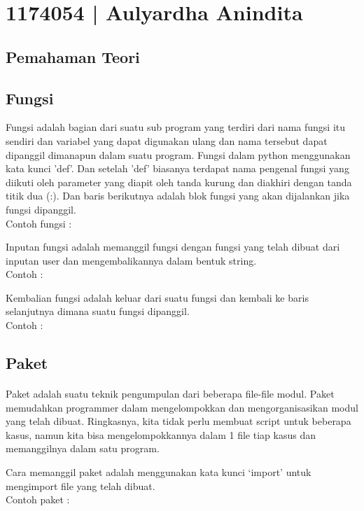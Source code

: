 \section{1174054 | Aulyardha Anindita}
\subsection{Pemahaman Teori}
\subsection{Fungsi}
Fungsi adalah bagian dari suatu sub program yang terdiri dari nama fungsi itu sendiri dan variabel yang dapat digunakan ulang dan nama tersebut dapat dipanggil dimanapun dalam suatu program. Fungsi dalam python menggunakan kata kunci 'def'. Dan setelah 'def' biasanya terdapat nama pengenal fungsi yang diikuti oleh parameter yang diapit oleh tanda kurung dan diakhiri dengan tanda titik dua (:). Dan baris berikutnya adalah blok fungsi yang akan dijalankan jika fungsi dipanggil.\\
Contoh fungsi :


Inputan fungsi adalah memanggil fungsi dengan fungsi yang telah dibuat dari inputan user dan mengembalikannya dalam bentuk string. \\
Contoh :


Kembalian fungsi adalah keluar dari suatu fungsi dan kembali ke baris selanjutnya dimana suatu fungsi dipanggil.\\
Contoh :


\subsection{Paket}
\paragraph{}
Paket adalah suatu teknik pengumpulan dari beberapa file-file modul. Paket memudahkan programmer dalam mengelompokkan dan mengorganisasikan modul yang telah dibuat. Ringkasnya, kita tidak perlu membuat script untuk beberapa kasus, namun kita bisa mengelompokkannya dalam 1 file tiap kasus dan memanggilnya dalam satu program.

Cara memanggil paket adalah menggunakan kata kunci ‘import’ untuk mengimport file yang telah dibuat.\\
Contoh paket :


